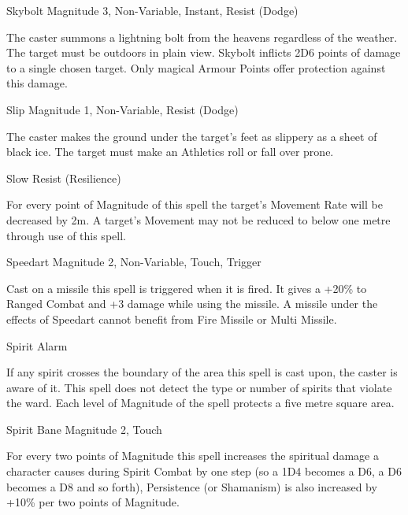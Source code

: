 \begin{rpg-spell}
{Skybolt}
{Magnitude 3, Non-Variable, Instant, Resist (Dodge)}

The caster summons a lightning bolt from the heavens regardless of the weather. The target must be outdoors in plain view. Skybolt inflicts 2D6 points of damage to a single chosen target. Only magical Armour Points offer protection against this damage.
\end{rpg-spell}


\begin{rpg-spell}
{Slip}
{Magnitude 1, Non-Variable, Resist (Dodge)}

The caster makes the ground under the target’s feet as slippery as a sheet of black ice. The target must make an Athletics roll or fall over prone.
\end{rpg-spell}


\begin{rpg-spell}
{Slow}
{Resist (Resilience)}

For every point of Magnitude of this spell the target’s Movement Rate will be decreased by 2m. A target’s Movement may not be reduced to below one metre through use of this spell. 
\end{rpg-spell}


\begin{rpg-spell}
{Speedart}
{Magnitude 2, Non-Variable, Touch, Trigger}

Cast on a missile this spell is triggered when it is fired. It gives a +20\% to Ranged Combat and +3 damage while using the missile. A missile under the effects of Speedart cannot benefit from Fire Missile or Multi Missile.
\end{rpg-spell}


\begin{rpg-spell}
{Spirit Alarm}
{}

If any spirit crosses the boundary of the area this spell is cast upon, the caster is aware of it. This spell does not detect the type or number of spirits that violate the ward. Each level of Magnitude of the spell protects a five metre square area.
\end{rpg-spell}


\begin{rpg-spell}
{Spirit Bane}
{Magnitude 2, Touch}

For every two points of Magnitude this spell increases the spiritual damage a character causes during Spirit Combat by one step (so a 1D4 becomes a D6, a D6 becomes a D8 and so forth), Persistence (or Shamanism) is also increased by +10\% per two points of Magnitude.
\end{rpg-spell}


